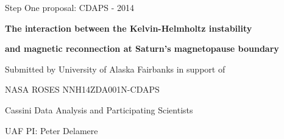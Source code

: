 \documentclass[indentfirst,12pt,letterpaper]{article}
\begin{document}



\setcounter{page}{0}


\thispagestyle{empty}




\thispagestyle{empty}



\centerline{\large Step One proposal: CDAPS - 2014}

\vspace{0.5in}

\centerline{\large \bf The interaction between the Kelvin-Helmholtz instability}\centerline{\large \bf and magnetic reconnection at Saturn's magnetopause boundary}

\vspace{0.5in}
\centerline{Submitted by University of Alaska Fairbanks in support of}
\centerline{NASA ROSES NNH14ZDA001N-CDAPS  }
\centerline{Cassini Data Analysis and Participating Scientists}

\centerline{UAF PI: Peter Delamere}


\newpage

\end{document}
